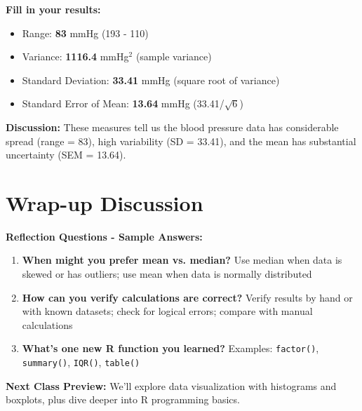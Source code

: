 \documentclass[11pt]{article}
\begin{document}
\textbf{Fill in your results:}
\begin{itemize}
\item Range: \textcolor{answergreen}{\textbf{83}} mmHg \textcolor{answergreen}{(193 - 110)}
\item Variance: \textcolor{answergreen}{\textbf{1116.4}} mmHg$^2$ \textcolor{answergreen}{(sample variance)}
\item Standard Deviation: \textcolor{answergreen}{\textbf{33.41}} mmHg \textcolor{answergreen}{(square root of variance)}
\item Standard Error of Mean: \textcolor{answergreen}{\textbf{13.64}} mmHg \textcolor{answergreen}{(33.41/$\sqrt{6}$)}
\end{itemize}

\textcolor{answergreen}{\textbf{Discussion:}} These measures tell us the blood pressure data has considerable spread (range = 83), high variability (SD = 33.41), and the mean has substantial uncertainty (SEM = 13.64).

\section{Wrap-up Discussion}

\textbf{Reflection Questions - Sample Answers:}
\begin{enumerate}
\item \textcolor{answergreen}{\textbf{When might you prefer mean vs. median?}} Use median when data is skewed or has outliers; use mean when data is normally distributed
\item \textcolor{answergreen}{\textbf{How can you verify calculations are correct?}} Verify results by hand or with known datasets; check for logical errors; compare with manual calculations
\item \textcolor{answergreen}{\textbf{What's one new R function you learned?}} Examples: \texttt{factor()}, \texttt{summary()}, \texttt{IQR()}, \texttt{table()}
\end{enumerate}

\textbf{Next Class Preview:}
We'll explore data visualization with histograms and boxplots, plus dive deeper into R programming basics.
\end{document}
